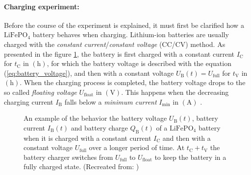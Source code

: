 \paragraph*{Charging experiment:} %
Before the course of the experiment is explained, it must first be clarified how a $\mathrm{LiFePO}_4$ battery behaves when charging. Lithium-ion batteries are usually charged with the \emph{constant current}/\emph{constant voltage} (CC/CV) method. As presented in the figure \ref{fig:tikz_cccv_curve}, the battery is first charged with a constant current $I_\mathrm{C}$ for $t_\mathrm{C}$ in $\left(\mathrm{h}\right)$, for which the battery voltage is described with the equation (\ref{eq:battery_voltage}), and then with a constant voltage $U_\mathrm{B}(t) = U_\mathrm{full}$ for $t_\mathrm{V}$ in $\left(\mathrm{h}\right)$. When the charging process is completed, the battery voltage drops to the so called \emph{floating voltage} $U_\mathrm{float}$ in $\left(\mathrm{V}\right)$. This happens when the decreasing charging current $I_\mathrm{B}$ falls below a \emph{minimum current} $I_\mathrm{min}$ in $\left(\mathrm{A}\right)$ \cite{Notten:2005, Mertens:2015, Sterner:2017, Kurzweil:2018, Liu:2020}.
\begin{figure}[h!]
	\centering
	
	\caption{An example of the behavior the battery voltage $U_\mathrm{B}(t)$, battery current $I_\mathrm{B}(t)$ and battery charge $Q_\mathrm{B}(t)$ of a $\mathrm{LiFePO}_4$ battery when it is charged with a constant current $I_\mathrm{C}$ and then with a constant voltage $U_\mathrm{full}$ over a longer period of time. At $t_\mathrm{C} + t_\mathrm{V}$ the battery charger switches from $U_\mathrm{full}$ to $U_\mathrm{float}$ to keep the battery in a fully charged state. (Recreated from: \cite{Notten:2005, Sterner:2017, Liu:2020})}
	\label{fig:tikz_cccv_curve}
\end{figure} 

